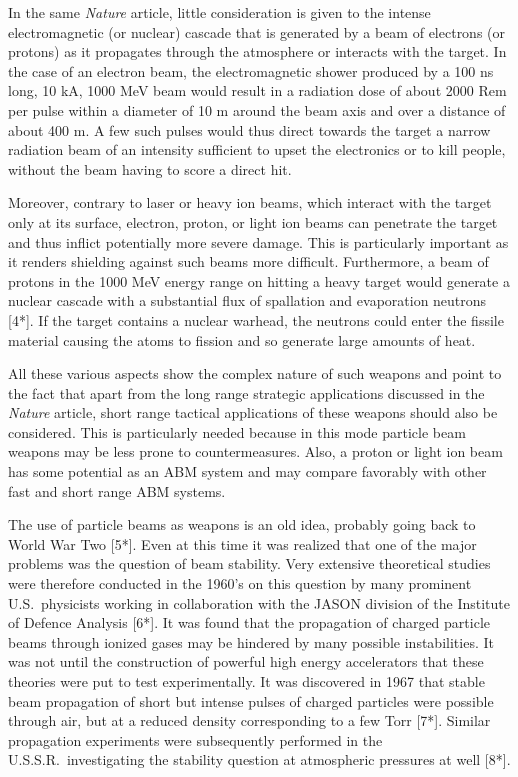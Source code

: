 \documentclass [12pt,a4paper,     ]{report} %
\begin{document}
   In the same \emph{Nature} article, little consideration is given to the intense electromagnetic (or nuclear) cascade that is generated by a beam of electrons (or protons) as it propagates through the atmosphere or interacts with the target.  In the case of an electron beam, the electromagnetic shower produced by a 100 ns long, 10 kA, 1000 MeV beam would result in a radiation dose of about 2000 Rem per pulse within a diameter of 10 m around the beam axis and over a distance of about 400 m.  A few such pulses would thus direct towards the target a narrow radiation beam of an intensity sufficient to upset the electronics or to kill people, without the beam having to score a direct hit.

   Moreover, contrary to laser or heavy ion beams, which interact with the target only at its surface, electron, proton, or light ion beams can penetrate the target and thus inflict potentially more severe damage.  This is particularly important as it renders shielding against such beams more difficult.  Furthermore, a beam of protons in the 1000 MeV energy range on hitting a heavy target would generate a nuclear cascade with a substantial flux of spallation and evaporation neutrons [4*].  If the target contains a nuclear warhead, the neutrons could enter the fissile material causing the atoms to fission and so generate large amounts of heat.

   All these various aspects show the complex nature of such weapons and point to the fact that apart from the long range strategic applications discussed in the \emph{Nature} article, short range tactical applications of these weapons should also be considered.  This is particularly needed because in this mode particle beam weapons may be less prone to countermeasures.  Also, a proton or light ion beam has some potential as an ABM system and may compare favorably with other fast and short range ABM systems.

   The use of particle beams as weapons is an old idea, probably going back to World War Two [5*].  Even at this time it was realized that one of the major problems was the question of beam stability.  Very extensive theoretical studies were therefore conducted in the 1960's on this question by many prominent U.S.\ physicists working in collaboration with the JASON division of the Institute of Defence Analysis [6*].  It was found that the propagation of charged particle beams through ionized gases may be hindered by many possible instabilities.  It was not until the construction of powerful high energy accelerators that these theories were put to test experimentally.  It was discovered in 1967 that stable beam propagation of short but intense pulses of charged particles were possible through air, but at a reduced density corresponding to a few Torr [7*].  Similar propagation experiments were subsequently performed in the U.S.S.R.\ investigating the stability question at atmospheric pressures at well [8*].
\end{document}
